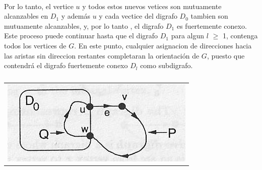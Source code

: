 \paragraph{}
Por lo tanto, el vertice $u$ y todos estos nuevos vetices son mutuamente alcanzables en $D_1$ y además $u$ y cada vectice del digrafo $D_0$ tambien son mutuamente alcanzables, y, por lo tanto , el digrafo $D_1$ es fuertemente conexo. Este proceso puede continuar hasta que el digrafo $D_1$ para algun $l$ $\geq$ 1, contenga todos los vertices de $G$. En este punto, cualquier asignacion de direcciones hacia las aristas sin direccion restantes completaran la orientación de $G$, puesto que contendrá el digrafo fuertemente conexo $D_l$ como subdigrafo.



	\begin{table}[h!] %
		\centering %
			\begin{tabular}{c}
				\includegraphics[scale=0.7]{./otros/figura3.jpg} 

				\end{tabular}
				\caption{} %
				\label{} %
	\end{table}

